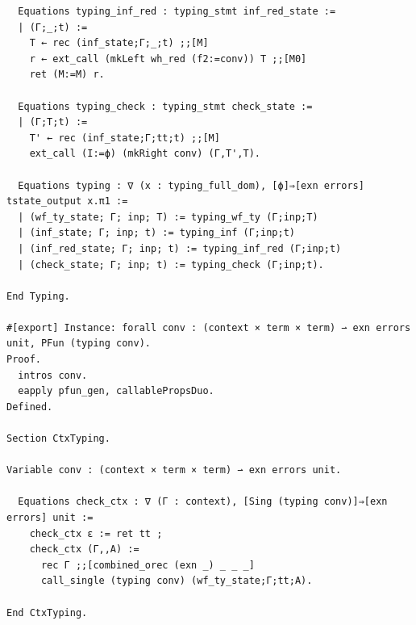 \documentclass[10pt,a4paper]{amsart}
\begin{document}
\begin{lstlisting}
  Equations typing_inf_red : typing_stmt inf_red_state :=
  | (Γ;_;t) :=
    T ← rec (inf_state;Γ;_;t) ;;[M]
    r ← ext_call (mkLeft wh_red (f2:=conv)) T ;;[M0]
    ret (M:=M) r.

  Equations typing_check : typing_stmt check_state :=
  | (Γ;T;t) :=
    T' ← rec (inf_state;Γ;tt;t) ;;[M]
    ext_call (I:=ϕ) (mkRight conv) (Γ,T',T).

  Equations typing : ∇ (x : typing_full_dom), [ϕ]⇒[exn errors] tstate_output x.π1 :=
  | (wf_ty_state; Γ; inp; T) := typing_wf_ty (Γ;inp;T)
  | (inf_state; Γ; inp; t) := typing_inf (Γ;inp;t)
  | (inf_red_state; Γ; inp; t) := typing_inf_red (Γ;inp;t)
  | (check_state; Γ; inp; t) := typing_check (Γ;inp;t).

End Typing.

#[export] Instance: forall conv : (context × term × term) ⇀ exn errors unit, PFun (typing conv).
Proof.
  intros conv.
  eapply pfun_gen, callablePropsDuo.
Defined.

Section CtxTyping.

Variable conv : (context × term × term) ⇀ exn errors unit.

  Equations check_ctx : ∇ (Γ : context), [Sing (typing conv)]⇒[exn errors] unit :=
    check_ctx ε := ret tt ;
    check_ctx (Γ,,A) :=
      rec Γ ;;[combined_orec (exn _) _ _ _]
      call_single (typing conv) (wf_ty_state;Γ;tt;A).

End CtxTyping.
\end{lstlisting}
\end{document}
